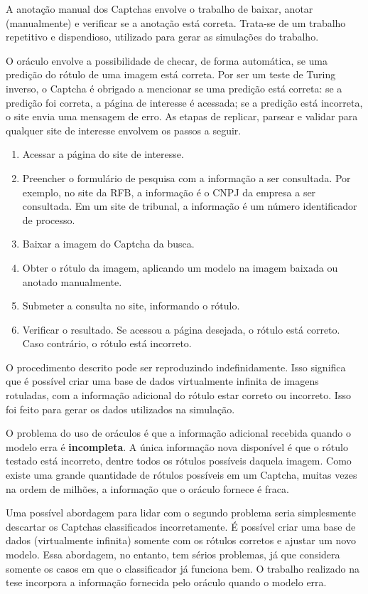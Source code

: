 \documentclass[12pt,twoside,brazilian]{book}
\providecommand{\tightlist}{%
  \setlength{\itemsep}{0pt}\setlength{\parskip}{0pt}}
\begin{document}
A anotação manual dos Captchas envolve o trabalho de baixar, anotar
(manualmente) e verificar se a anotação está correta. Trata-se de um
trabalho repetitivo e dispendioso, utilizado para gerar as simulações do
trabalho.

O oráculo envolve a possibilidade de checar, de forma automática, se uma
predição do rótulo de uma imagem está correta. Por ser um teste de
Turing inverso, o Captcha é obrigado a mencionar se uma predição está
correta: se a predição foi correta, a página de interesse é acessada; se
a predição está incorreta, o site envia uma mensagem de erro. As etapas
de replicar, parsear e validar para qualquer site de interesse envolvem
os passos a seguir.

\begin{enumerate}
\def\labelenumi{\arabic{enumi}.}
\tightlist
\item
  Acessar a página do site de interesse.
\item
  Preencher o formulário de pesquisa com a informação a ser consultada.
  Por exemplo, no site da RFB, a informação é o CNPJ da empresa a ser
  consultada. Em um site de tribunal, a informação é um número
  identificador de processo.
\item
  Baixar a imagem do Captcha da busca.
\item
  Obter o rótulo da imagem, aplicando um modelo na imagem baixada ou
  anotado manualmente.
\item
  Submeter a consulta no site, informando o rótulo.
\item
  Verificar o resultado. Se acessou a página desejada, o rótulo está
  correto. Caso contrário, o rótulo está incorreto.
\end{enumerate}

O procedimento descrito pode ser reproduzindo indefinidamente. Isso
significa que é possível criar uma base de dados virtualmente infinita
de imagens rotuladas, com a informação adicional do rótulo estar correto
ou incorreto. Isso foi feito para gerar os dados utilizados na
simulação.

O problema do uso de oráculos é que a informação adicional recebida
quando o modelo erra é \textbf{incompleta}. A única informação nova
disponível é que o rótulo testado está incorreto, dentre todos os
rótulos possíveis daquela imagem. Como existe uma grande quantidade de
rótulos possíveis em um Captcha, muitas vezes na ordem de milhões, a
informação que o oráculo fornece é fraca.

Uma possível abordagem para lidar com o segundo problema seria
simplesmente descartar os Captchas classificados incorretamente. É
possível criar uma base de dados (virtualmente infinita) somente com os
rótulos corretos e ajustar um novo modelo. Essa abordagem, no entanto,
tem sérios problemas, já que considera somente os casos em que o
classificador já funciona bem. O trabalho realizado na tese incorpora a
informação fornecida pelo oráculo quando o modelo erra.
\end{document}

